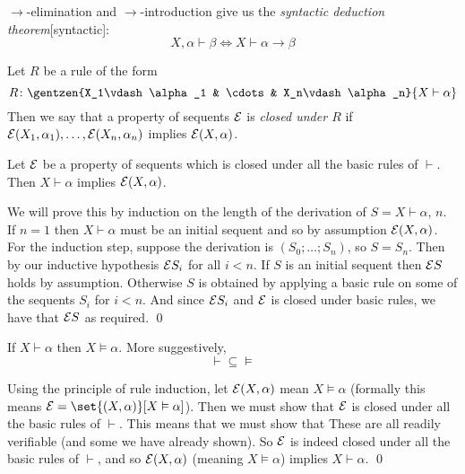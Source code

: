 $\to$-elimination and $\to$-introduction give us the {\it syntactic deduction theorem}[syntactic]:
$$ X,\alpha\vdash\beta \iff X\vdash\alpha\to\beta $$

Let $R$ be a rule of the form
$$ R\colon \gentzen{X_1\vdash\alpha_1 & \cdots & X_n\vdash\alpha_n}{X\vdash\alpha} $$
Then we say that a property of sequents ${\cal E}$ is {\it closed under $R$} if ${\cal E}(X_1,\alpha_1),\dots,{\cal E}(X_n,\alpha_n)$ implies ${\cal E}(X,\alpha)$.

\bprop[title=Principle of Rule Induction, name=ruleinduction]

    Let ${\cal E}$ be a property of sequents which is closed under all the basic rules of $\vdash$.
    Then $X\vdash\alpha$ implies ${\cal E}(X,\alpha)$.

\eprop

We will prove this by induction on the length of the derivation of $S=X\vdash\alpha$, $n$.
If $n=1$ then $X\vdash\alpha$ must be an initial sequent and so by assumption ${\cal E}(X,\alpha)$.
For the induction step, suppose the derivation is $(S_0;\dots;S_n)$, so $S=S_n$.
Then by our inductive hypothesis ${\cal E}S_i$ for all $i<n$.
If $S$ is an initial sequent then ${\cal E}S$ holds by assumption.
Otherwise $S$ is obtained by applying a basic rule on some of the sequents $S_i$ for $i<n$.
And since ${\cal E}S_i$ and ${\cal E}$ is closed under basic rules, we have that ${\cal E}S$ as required.
\qed

\blemm

    If $X\vdash\alpha$ then $X\vDash\alpha$.
    More suggestively,
    $$ {\vdash}\subseteq{\vDash} $$

\elemm

Using the principle of rule induction, let ${\cal E}(X,\alpha)$ mean $X\vDash\alpha$ (formally this means ${\cal E}=\set{(X,\alpha)}[X\vDash\alpha]$).
Then we must show that ${\cal E}$ is closed under all the basic rules of $\vdash$.
This means that we must show that
These are all readily verifiable (and some we have already shown).
So ${\cal E}$ is indeed closed under all the basic rules of $\vdash$, and so ${\cal E}(X,\alpha)$ (meaning $X\vDash\alpha$) implies $X\vdash\alpha$.
\qed


